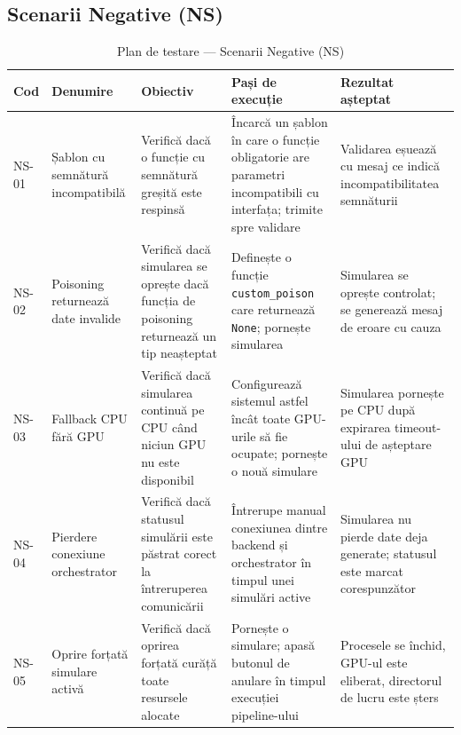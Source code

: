 \documentclass[../../main.tex]{subfiles}
\begin{document}
    \subsection{Scenarii Negative (NS)}

    \begin{table}[H]
        \centering
        \footnotesize
        \begin{tabular}{|p{}|p{}|p{}|p{}|p{}|}
            \hline
            \textbf{Cod} & \textbf{Denumire} & \textbf{Obiectiv} & \textbf{Pași de execuție} & \textbf{Rezultat așteptat} \\
            \hline
            NS-01 & Șablon cu semnătură incompatibilă & Verifică dacă o funcție cu semnătură greșită este respinsă & Încarcă un șablon în care o funcție obligatorie are parametri incompatibili cu interfața; trimite spre validare & Validarea eșuează cu mesaj ce indică incompatibilitatea semnăturii \\
            \hline
            NS-02 & Poisoning returnează date invalide & Verifică dacă simularea se oprește dacă funcția de poisoning returnează un tip neașteptat & Definește o funcție \texttt{custom\_poison} care returnează \texttt{None}; pornește simularea & Simularea se oprește controlat; se generează mesaj de eroare cu cauza \\
            \hline
            NS-03 & Fallback CPU fără GPU & Verifică dacă simularea continuă pe CPU când niciun GPU nu este disponibil & Configurează sistemul astfel încât toate GPU-urile să fie ocupate; pornește o nouă simulare & Simularea pornește pe CPU după expirarea timeout-ului de așteptare GPU \\
            \hline
            NS-04 & Pierdere conexiune orchestrator & Verifică dacă statusul simulării este păstrat corect la întreruperea comunicării & Întrerupe manual conexiunea dintre backend și orchestrator în timpul unei simulări active & Simularea nu pierde date deja generate; statusul este marcat corespunzător \\
            \hline
            NS-05 & Oprire forțată simulare activă & Verifică dacă oprirea forțată curăță toate resursele alocate & Pornește o simulare; apasă butonul de anulare în timpul execuției pipeline-ului & Procesele se închid, GPU-ul este eliberat, directorul de lucru este șters \\
            \hline
        \end{tabular}
        \caption{Plan de testare --- Scenarii Negative (NS)}
        \label{tab:test_ns}
    \end{table}
\end{document}
